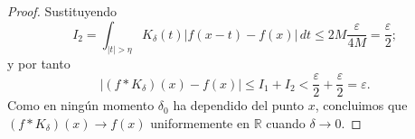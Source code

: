 \documentclass[12pt]{article}
\newcommand{\R}{\mathbb{R}}
\theoremstyle{plain}
\theoremstyle{definition}
\numberwithin{equation}{section}
\begin{document}
\begin{proof}
                Sustituyendo
                \begin{equation*}
                    I_2 = \int_{\left\lvert t \right\rvert > \eta} K_\delta(t) \left\lvert f(x-t) - f(x) \right\rvert \,dt \le 2M \frac{\varepsilon}{4M} = \frac{\varepsilon}{2};
                \end{equation*}
                y por tanto
                \begin{equation*}
                    \left\lvert (f * K_\delta)(x) - f(x) \right\rvert \le I_1 + I_2 < \frac{\varepsilon}{2} + \frac{\varepsilon}{2} = \varepsilon.
                \end{equation*}
                Como en ningún momento \(\delta_0\) ha dependido del punto \(x\), concluimos que \((f * K_\delta)(x) \longrightarrow f(x)\) uniformemente en \(\R\) cuando \(\delta \to 0\).
            \end{proof}
\end{document}
